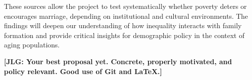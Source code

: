 These sources allow the project to test systematically whether poverty deters or encourages marriage, depending on institutional and cultural environments. The findings will deepen our understanding of how inequality interacts with family formation and provide critical insights for demographic policy in the context of aging populations.

\bigskip 

\noindent \textbf{[JLG: Your best proposal yet. Concrete, properly motivated, and policy relevant. Good use of Git and \LaTeX.]}

\newpage







